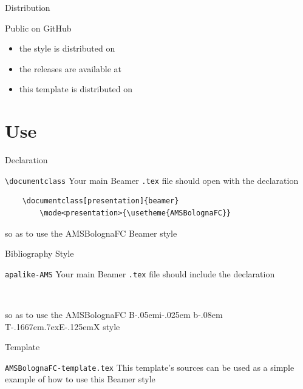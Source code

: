 \documentclass[presentation,cesena,apice]{beamer}\mode<presentation>{\usetheme{AMSBolognaFC}}
\def\BibTeX{{\rm B\kern-.05em{\sc i\kern-.025em b}\kern-.08em
    T\kern-.1667em\lower.7ex\hbox{E}\kern-.125emX}}
\begin{document}
\begin{frame}[c]{Distribution}
%
\begin{block}{Public on GitHub}
	\begin{itemize}
		\item the style is distributed on 
		\item the releases are available at 
		\item this template is distributed on 
	\end{itemize}
\end{block}
%
\end{frame}

\section{Use}

\begin{frame}[c,fragile]{Declaration}
%
\begin{block}{\texttt{\textbackslash{}documentclass}}
Your main Beamer \texttt{.tex} file should open with the declaration
%
\begin{verbatim}
    \documentclass[presentation]{beamer}
        \mode<presentation>{\usetheme{AMSBolognaFC}}
\end{verbatim}
%
so as to use the AMSBolognaFC Beamer style
\end{block}
%
\end{frame}

\begin{frame}[c,fragile]{Bibliography Style}
%
\begin{block}{\texttt{apalike-AMS}}
Your main Beamer \texttt{.tex} file should include the declaration
\begin{verbatim}
    
\end{verbatim}
so as to use the AMSBolognaFC \BibTeX{} style
\end{block}
%
\end{frame}

\begin{frame}[c,fragile]{Template}
%
\begin{block}{\texttt{AMSBolognaFC-template.tex}}
This template's sources can be used as a simple example of how to use this Beamer style
\end{block}
%
\end{frame}
\end{document}
